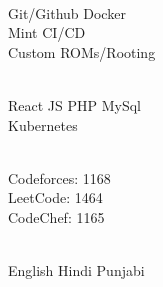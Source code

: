 \documentclass[]{deedy-resume-openfont}
\begin{document}
\begin{minipage}[t]{0.33\textwidth}
 \\
\textbullet{} Git/Github \textbullet{} Docker \\ \textbullet{} Mint \textbullet{} CI/CD \\ \textbullet{} Custom ROMs/Rooting \\
\sectionsep

 \\
\textbullet{} React JS \textbullet{} PHP \textbullet{} MySql \\ \textbullet{} Kubernetes
\sectionsep

 \\
\textbullet{} Codeforces: 1168 \\
\textbullet{} LeetCode: 1464 \\
\textbullet{} CodeChef: 1165 \\
\sectionsep

 \\
\textbullet{} English \textbullet{} Hindi \textbullet{} Punjabi
\sectionsep

%
%

\end{minipage} 
\hfill
\end{document}
